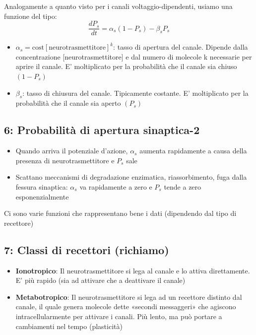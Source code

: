 Analogamente a quanto visto per i canali voltaggio-dipendenti, usiamo una funzione del tipo:
\[ \frac{dP_{s}}{dt} = \alpha_{s}(1 - P_{s}) - \beta_{s} P_{s} \]
\begin{itemize}
    \item $\alpha_{s} = \text{cost}[\text{neurotrasmettitore}]^{k}$: tasso di apertura del canale. Dipende dalla concentrazione [neurotrasmettitore] e dal numero di molecole k necessarie per aprire il canale. E' moltiplicato per la probabilità che il canale sia chiuso $(1-P_{s})$
    \item $\beta_{s}$: tasso di chiusura del canale. Tipicamente costante. E' moltiplicato per la probabilità che il canale sia aperto $(P_{s})$
\end{itemize}


\subsection*{ 6: Probabilità di apertura sinaptica-2}

\begin{itemize}
    \item Quando arriva il potenziale d'azione, $\alpha_{s}$ aumenta rapidamente a causa della presenza di neurotrasmettitore e $P_{s}$ sale
    \item Scattano meccanismi di degradazione enzimatica, riassorbimento, fuga dalla fessura sinaptica: $\alpha_{s}$ va rapidamente a zero e $P_{s}$ tende a zero esponenzialmente
\end{itemize}
Ci sono varie funzioni che rappresentano bene i dati (dipendendo dal tipo di recettore)


\subsection*{ 7: Classi di recettori (richiamo)}

\begin{itemize}
    \item \textbf{Ionotropico}: Il neurotrasmettitore si lega al canale e lo attiva direttamente. E' più rapido (sia ad attivare che a deattivare il canale)
    \item \textbf{Metabotropico}: Il neurotrasmettitore si lega ad un recettore distinto dal canale, il quale genera molecole dette «secondi messaggeri» che agiscono intracellularmente per attivare i canali. Più lento, ma può portare a cambiamenti nel tempo (plasticità)
\end{itemize}

